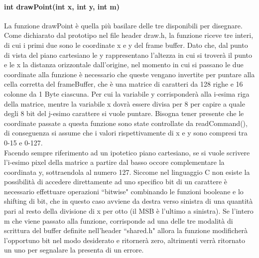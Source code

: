 \documentclass[a4paper]{article}
\begin{document}
		\paragraph{int drawPoint(int x, int y, int m)} La funzione drawPoint è quella più basilare delle tre disponibili per disegnare. Come dichiarato dal prototipo nel file header draw.h, la funzione riceve tre interi, di cui i primi due sono le coordinate x e y del frame buffer. Dato che, dal punto di vista del piano cartesiano le y rappresentano l'altezza in cui si troverà il punto e le x la distanza orizzontale dall'origine, nel momento in cui si passano le due coordinate alla funzione è necessario che queste vengano invertite per puntare alla cella corretta del frameBuffer, che è una matrice di caratteri da 128 righe e 16 colonne da 1 Byte ciascuna. Per cui la variabile y corrisponderà alla i-esima riga della matrice, mentre la variabile x dovrà essere divisa per 8 per capire a quale degli 8 bit del j-esimo carattere si vuole puntare. Bisogna tener presente che le coordinate passate a questa funzione sono state controllate da readCommand(), di conseguenza si assume che i valori rispettivamente di x e y sono compresi tra 0-15 e 0-127.\\
		Facendo sempre riferimento ad un ipotetico piano cartesiano, se si vuole scrivere l'i-esimo pixel della matrice a partire dal basso occore complementare la coordinata y, sottraendola al numero 127. Siccome nel linguaggio C non esiste la possibilità di accedere direttamente ad uno specifico bit di un carattere è necessario effettuare operazioni ``bitwise" combinando le funzioni booleane e lo shifting di bit, che in questo caso avviene da destra verso sinistra di una quantità pari al resto della divisione di x per otto (il MSB è l'ultimo a sinistra).
		\newline
		Se l'intero m che viene passato alla funzione, corrisponde ad una delle tre modalità di scrittura del buffer definite nell'header ``shared.h" allora la funzione modificherà l'opportuno bit nel modo desiderato e ritornerà zero, altrimenti verrà ritornato un uno per segnalare la presenta di un errore. 
\end{document}
